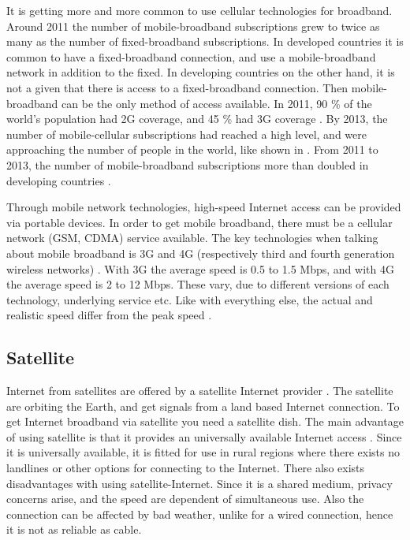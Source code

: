 It is getting more and more common to use cellular technologies for broadband. Around 2011 the number of mobile-broadband subscriptions grew to twice as many as the number of fixed-broadband subscriptions. In developed countries it is common to have a fixed-broadband connection, and use a mobile-broadband network in addition to the fixed. In developing countries on the other hand, it is not a given that there is access to a fixed-broadband connection. Then mobile-broadband can be the only method of access available. In 2011, 90 \% of the world's population had 2G coverage, and 45 \% had 3G coverage \cite{itu2011}. By 2013, the number of mobile-cellular subscriptions had reached a high level, and were approaching the number of people in the world, like shown in . From 2011 to 2013, the number of mobile-broadband  subscriptions more than doubled in developing countries \cite{itu2013}. 

Through mobile network technologies, high-speed Internet access can be provided via portable devices. In order to get mobile broadband, there must be a cellular network (GSM, CDMA) service available. The key technologies when talking about mobile broadband is 3G and 4G (respectively third and fourth generation wireless networks) \cite{mobilebroadband}. With 3G the average speed is 0.5 to 1.5 Mbps, and with 4G the average speed is 2 to 12 Mbps. These vary, due to different versions of each technology, underlying service etc. Like with everything else, the actual and realistic speed differ from the peak speed \cite{3gvs4g}. 


\subsection{Satellite}
Internet from satellites are offered by a satellite Internet provider \cite{cablevssatellite}. The satellite are orbiting the Earth, and get signals from a land based Internet connection. To get Internet broadband via satellite you need a satellite dish. The main advantage of using satellite is that it provides an universally available Internet access \cite{broadband}. Since it is universally available, it is fitted for use in rural regions where there exists no landlines or other options for connecting to the Internet. There also exists disadvantages with using satellite-Internet. Since it is a shared medium, privacy concerns arise, and the speed are dependent of simultaneous use. Also the connection can be affected by bad weather, unlike for a wired connection, hence it is not as reliable as cable. 


